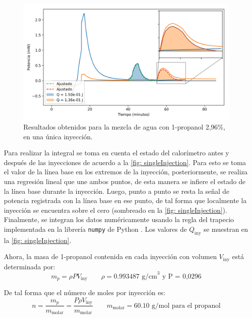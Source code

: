 		\begin{figure}[h]
			\centering
			\includegraphics[width=\linewidth]{../Data/ChemicalCalibrations/singlePropanol}
			\caption{Resultados obtenidos para la mezcla de agua con 1-propanol 2,96\%, en una \'unica inyecci\'on.}
			\label{fig: singleInjection}
		\end{figure}
		
		Para realizar la integral se toma en cuenta el estado del calor\'imetro antes y despu\'es de las inyecciones de acuerdo a la \autoref{fig: singleInjection}. Para esto se toma el valor de la l\'inea base en los extremos de la inyecci\'on, posteriormente, se realiza una regresi\'on lineal que une ambos puntos, de esta manera se infiere el estado de la l\'inea base durante la inyecci\'on. Luego, punto a punto se resta la se\~nal de potencia registrada con la l\'inea base en ese punto, de tal forma que localmente la inyecci\'on se encuentra sobre el cero (sombreado en la \autoref{fig: singleInjection}). Finalmente, se integran los datos num\'ericamente usando la regla del trapecio implementada en la librer\'ia \texttt{numpy} de Python \cite{landau2008survey, walt2011numpy}. Los valores de $Q_\text{iny}$ se muestran en la \autoref{fig: singleInjection}.
		
		Ahora, la masa de 1-propanol contenida en cada inyecci\'on con volumen $V_\text{iny}$ est\'a determinada por:
		\begin{equation}
			m_p = \rho PV_\text{iny} \qquad \rho = 0.993487 \text{ g/cm}^3 \text{ y P = 0,0296}
		\end{equation}
		
		De tal forma que el n\'umero de moles por inyecci\'on es:
		\begin{equation}
			n = \dfrac{m_p}{m_\text{molar}} = \dfrac{P\rho V_\text{iny}}{m_\text{molar}} \qquad m_\text{molar} = 60.10 \text{ g/mol para el propanol}
		\end{equation}
		

